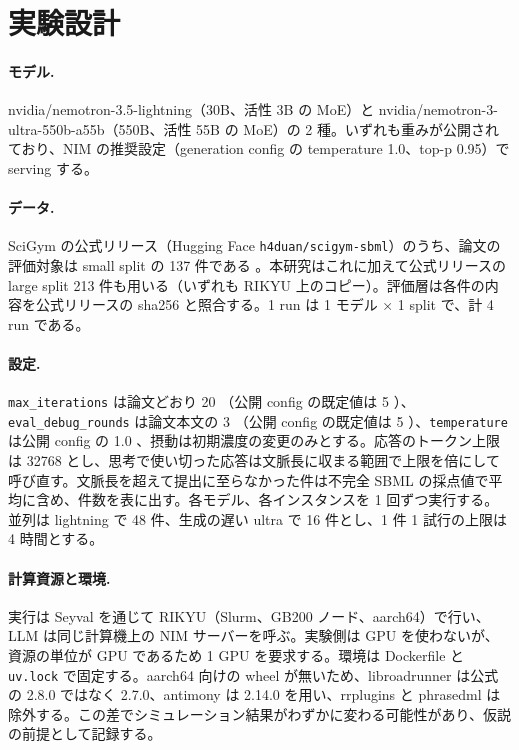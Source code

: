 \documentclass{article}
\begin{document}
\section{実験設計}
\label{sec:design}
\paragraph{モデル.}
nvidia/nemotron-3.5-lightning（30B、活性 3B の MoE）と nvidia/nemotron-3-ultra-550b-a55b（550B、活性 55B の MoE）の 2 種。いずれも重みが公開されており、NIM の推奨設定（generation config の temperature 1.0、top-p 0.95）で serving する。

\paragraph{データ.}
SciGym の公式リリース（Hugging Face \texttt{h4duan/scigym-sbml}）のうち、論文の評価対象は small split の 137 件である \cite[s1.p2]{duan-2025-measuring}。本研究はこれに加えて公式リリースの large split 213 件も用いる（いずれも RIKYU 上のコピー）。評価層は各件の内容を公式リリースの sha256 と照合する。1 run は 1 モデル × 1 split で、計 4 run である。

\paragraph{設定.}
\texttt{max\_iterations} は論文どおり 20 \cite[s1.p3]{duan-2025-measuring}（公開 config の既定値は 5 \cite[s2.p2]{h4duan-2025-scigym}）、\texttt{eval\_debug\_rounds} は論文本文の 3 \cite[s1.p4]{duan-2025-measuring}（公開 config の既定値は 5 \cite[s2.p3]{h4duan-2025-scigym}）、\texttt{temperature} は公開 config の 1.0 \cite[s2.p1]{h4duan-2025-scigym}、摂動は初期濃度の変更のみとする。応答のトークン上限は 32768 とし、思考で使い切った応答は文脈長に収まる範囲で上限を倍にして呼び直す。文脈長を超えて提出に至らなかった件は不完全 SBML の採点値で平均に含め、件数を表に出す。各モデル、各インスタンスを 1 回ずつ実行する。並列は lightning で 48 件、生成の遅い ultra で 16 件とし、1 件 1 試行の上限は 4 時間とする。

\paragraph{計算資源と環境.}
実行は Seyval を通じて RIKYU（Slurm、GB200 ノード、aarch64）で行い、LLM は同じ計算機上の NIM サーバーを呼ぶ。実験側は GPU を使わないが、資源の単位が GPU であるため 1 GPU を要求する。環境は Dockerfile と \texttt{uv.lock} で固定する。aarch64 向けの wheel が無いため、libroadrunner は公式の 2.8.0 ではなく 2.7.0、antimony は 2.14.0 を用い、rrplugins と phrasedml は除外する。この差でシミュレーション結果がわずかに変わる可能性があり、仮説の前提として記録する。
\end{document}
